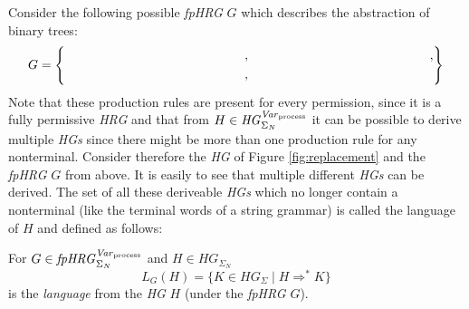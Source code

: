 	Consider the following possible \emph{\ac{fpHRG}} $G$ which describes the
	abstraction of binary trees:
	\begin{equation*}
		\label{eq:G}
		G = \left\{\begin{aligned}
			 & \parbox{5cm}{\resizebox{5cm}{!}{
					
				}}, \parbox{5cm}{\resizebox{5cm}{!}{
					
				}},\\& \parbox{5cm}{\resizebox{5cm}{!}{
					
				}}, \parbox{5cm}{\resizebox{5cm}{!}{
					
		}}
		\end{aligned} \right\}
	\end{equation*}
	Note that these production rules are present for every permission, since it
	is a fully permissive \emph{\ac{HRG}} and that from $H\in\mathit{HG}_{\Sigma_{N}}^{\mathit{Var}_{\text{process}}}$ it can be
	possible to derive multiple \emph{\acp{HG}} since there might be
	more than one production rule for any nonterminal. Consider
	therefore the \emph{\ac{HG}} of Figure \ref{fig:replacement} and the
	\emph{\ac{fpHRG}} $G$ from above. It is easily to see that multiple
	different \emph{\acp{HG}} can be derived. The set of all these deriveable
	\emph{\acp{HG}} which no longer contain a nonterminal (like the terminal
	words of a string grammar) is called the language of $H$ and defined as
	follows:
	\begin{definition}[Language of an \ac{HG}]
		For $G\in\mathit{fpHRG}_{\Sigma_{N}}^{\mathit{Var}_{\text{process}}}$ and $H\in\mathit{HG}_{\Sigma_{N}}$
		\begin{equation*}
			L_{G}(H) = \{K\in\mathit{HG}_{\Sigma} \mid H \Rightarrow^{*} K\}
		\end{equation*}
		is the \emph{language} from the \emph{\ac{HG}} $H$
		(under the \emph{\ac{fpHRG}} $G$).
	\end{definition}

